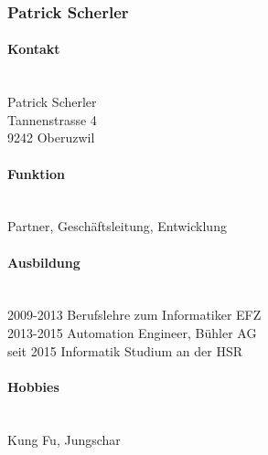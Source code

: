 \subsubsection{Patrick Scherler}
\noindent\begin{minipage}{0.7\textwidth}
	\paragraph{Kontakt} \hfill \\
	Patrick Scherler \\
	Tannenstrasse 4 \\
	9242 Oberuzwil \\
	
	\paragraph{Funktion} \hfill \\
	Partner, Geschäftsleitung, Entwicklung \\
	
	\paragraph{Ausbildung} \hfill \\
	2009-2013 \hspace{1cm} Berufslehre zum Informatiker EFZ \\
	2013-2015 \hspace{1cm} Automation Engineer, Bühler AG \\
	seit 2015 \hspace{1.25cm} Informatik Studium an der HSR \\
		
	\paragraph{Hobbies} \hfill \\
	Kung Fu, Jungschar \\
\end{minipage}
\hfill
